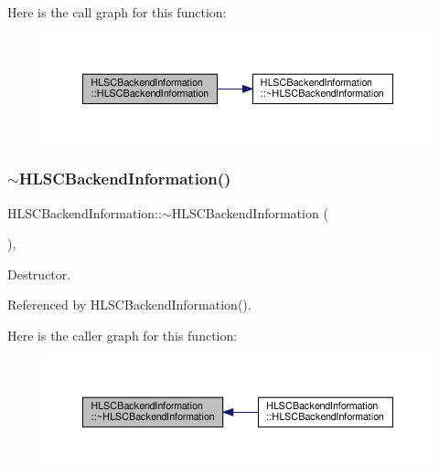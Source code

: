 Here is the call graph for this function\+:
\nopagebreak
\begin{figure}[H]
\begin{center}
\leavevmode
\includegraphics[width=350pt]{de/d0c/classHLSCBackendInformation_aa7c6657e78ed9a50ce7f049e3ffd53a6_cgraph}
\end{center}
\end{figure}
\mbox{\label{classHLSCBackendInformation_a074b076db11edaaf4a35fe85bd18e9ee}} 
\subsubsection{\texorpdfstring{$\sim$\+H\+L\+S\+C\+Backend\+Information()}{~HLSCBackendInformation()}}
{\footnotesize\ttfamily H\+L\+S\+C\+Backend\+Information\+::$\sim$\+H\+L\+S\+C\+Backend\+Information (\begin{DoxyParamCaption}{ }\end{DoxyParamCaption})\hspace{0.3cm}{\ttfamily [override]}, {\ttfamily [default]}}



Destructor. 



Referenced by H\+L\+S\+C\+Backend\+Information().

Here is the caller graph for this function\+:
\nopagebreak
\begin{figure}[H]
\begin{center}
\leavevmode
\includegraphics[width=350pt]{de/d0c/classHLSCBackendInformation_a074b076db11edaaf4a35fe85bd18e9ee_icgraph}
\end{center}
\end{figure}



